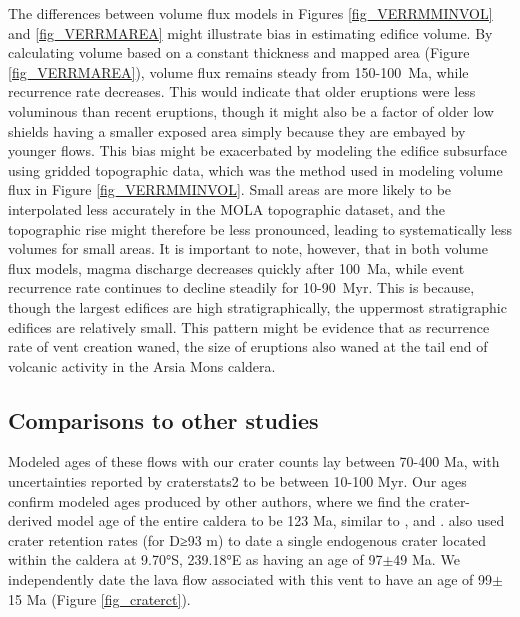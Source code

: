 \documentclass[12pt,letter]{article}
\begin{document}
The differences between volume flux models in Figures \ref{fig_VERRMMINVOL} and \ref{fig_VERRMAREA} might illustrate bias in estimating edifice volume. By calculating volume based on a constant thickness and mapped area (Figure \ref{fig_VERRMAREA}), volume flux remains steady from 150-100~Ma, while recurrence rate decreases. This would indicate that older eruptions were less voluminous than recent eruptions, though it might also be a factor of older low shields having a smaller exposed area simply because they are embayed by younger flows. This bias might be exacerbated by modeling the edifice subsurface using gridded topographic data, which was the method used in modeling volume flux in Figure \ref{fig_VERRMMINVOL}. Small areas are more likely to be interpolated less accurately in the MOLA topographic dataset, and the topographic rise might therefore be less pronounced, leading to systematically less volumes for small areas. It is important to note, however, that in both volume flux models, magma discharge decreases quickly after 100~Ma, while event recurrence rate continues to decline steadily for 10-90~Myr. This is because, though the largest edifices are high stratigraphically, the uppermost stratigraphic edifices are relatively small. This pattern might be evidence that as recurrence rate of vent creation waned, the size of eruptions also waned at the tail end of volcanic activity in the Arsia Mons caldera.

\subsection{Comparisons to other studies}

Modeled ages of these flows with our crater counts lay between 70-400 Ma, with uncertainties reported by craterstats2 to be between 10-100 Myr. Our ages confirm modeled ages produced by other authors, where we find the crater-derived model age of the entire caldera to be 123 Ma, similar to \citet{neukum2004recent}, \citet{werner2009global} and \citep{robbins2011volcanic}. \citet{robbins2011volcanic} also used crater retention rates (for D≥93 m) to date a single endogenous crater located within the caldera at 9.70°S, 239.18°E as having an age of 97$\pm$49 Ma. We independently date the lava flow associated with this vent to have an age of 99$\pm$15 Ma (Figure \ref{fig_craterct}).
\end{document}
